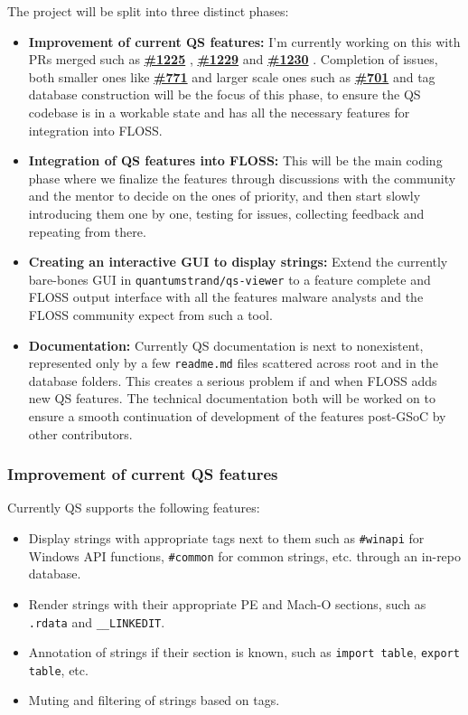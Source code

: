 \documentclass[12pt]{article}
\newcommand{\pr}[1]{%
  \href{https://github.com/mandiant/flare-floss/pull/#1}{\textbf{\##1}}%
}
\newcommand{\issue}[1]{%
    \href{https://github.com/mandiant/flare-floss/issues/#1}{\textbf{\##1}}%
}
\begin{document}
The project will be split into three distinct phases:

\begin{itemize}
    \item \textbf{Improvement of current QS features:} I'm currently working on this with PRs merged such as \pr{1225}, \pr{1229} and \pr{1230}. Completion of issues, both smaller ones like \issue{771} and larger scale ones such as \issue{701} and tag database construction will be the focus of this phase, to ensure the QS codebase is in a workable state and has all the necessary features for integration into FLOSS.
    \item \textbf{Integration of QS features into FLOSS:} This will be the main coding phase where we finalize the features through discussions with the community and the mentor to decide on the ones of priority, and then start slowly introducing them one by one, testing for issues, collecting feedback and repeating from there.
    \item \textbf{Creating an interactive GUI to display strings:} Extend the currently bare-bones GUI in \texttt{quantumstrand/qs-viewer} to a feature complete and FLOSS output interface with all the features malware analysts and the FLOSS community expect from such a tool.
    \item \textbf{Documentation:} Currently QS documentation is next to nonexistent, represented only by a few \texttt{readme.md} files scattered across root and in the database folders. This creates a serious problem if and when FLOSS adds new QS features. The technical documentation both will be worked on to ensure a smooth continuation of development of the features post-GSoC by other contributors.
\end{itemize}

\subsubsection*{Improvement of current QS features}
{}

Currently QS supports the following features:

\begin{itemize}
    \item Display strings with appropriate tags next to them such as \texttt{\#winapi} for Windows API functions, \texttt{\#common} for common strings, etc. through an in-repo database.
    \item Render strings with their appropriate PE and Mach-O sections, such as \texttt{.rdata} and \texttt{\_\_LINKEDIT}.
    \item Annotation of strings if their section is known, such as \texttt{import table}, \texttt{export table}, etc.
    \item Muting and filtering of strings based on tags.
\end{itemize}
\end{document}
